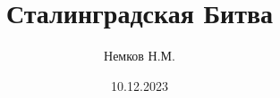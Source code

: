 

\title{Сталинградская Битва}
\author{Немков Н.М.}
\date{10.12.2023}



\begin{frame}
\maketitle
\end{frame}


\section{}
\begin{frame}{}
	\begin{columns}
		\begin{column}{0.45\textwidth}


		\end{column}


		\begin{column}{0.45\textwidth}


		\end{column}
	\end{columns}
\end{frame}

\begin{frame}{}


\end{frame}


\begin{frame}{}
	\begin{columns}
		\begin{column}{0.3\textwidth}


		\end{column}


		\begin{column}{0.5\textwidth}


		\end{column}
	\end{columns}



\end{frame}


